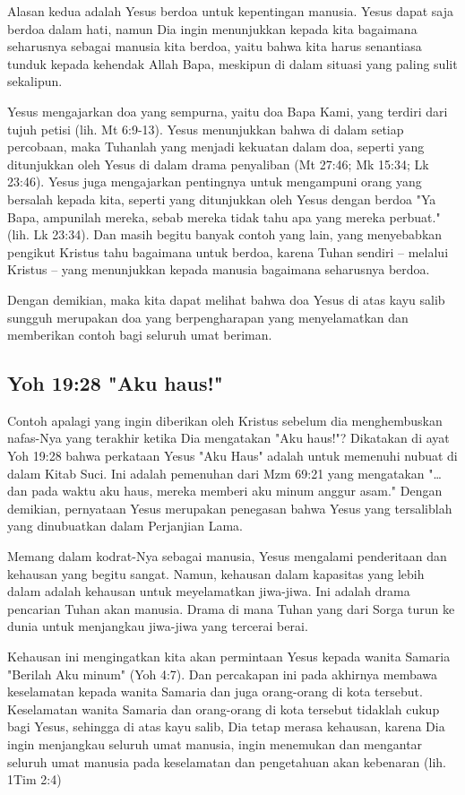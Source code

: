Alasan kedua adalah Yesus berdoa untuk kepentingan manusia. Yesus dapat saja
berdoa dalam hati, namun Dia ingin menunjukkan kepada kita bagaimana seharusnya
sebagai manusia kita berdoa, yaitu bahwa kita harus senantiasa tunduk kepada
kehendak Allah Bapa, meskipun di dalam situasi yang paling sulit sekalipun.

Yesus mengajarkan doa yang sempurna, yaitu doa Bapa Kami, yang terdiri dari
tujuh petisi (lih. Mt 6:9-13).
Yesus menunjukkan bahwa di dalam setiap percobaan, maka Tuhanlah yang menjadi
kekuatan dalam doa, seperti yang ditunjukkan oleh Yesus di dalam drama
penyaliban (Mt 27:46; Mk 15:34; Lk 23:46).
Yesus juga mengajarkan pentingnya untuk mengampuni orang yang bersalah kepada
kita, seperti yang ditunjukkan oleh Yesus dengan berdoa "Ya Bapa, ampunilah
mereka, sebab mereka tidak tahu apa yang mereka perbuat." (lih. Lk 23:34).
Dan masih begitu banyak contoh yang lain, yang menyebabkan pengikut Kristus
tahu bagaimana untuk berdoa, karena Tuhan sendiri – melalui Kristus – yang
menunjukkan kepada manusia bagaimana seharusnya berdoa.

Dengan demikian, maka kita dapat melihat bahwa doa Yesus di atas kayu salib
sungguh merupakan doa yang berpengharapan yang menyelamatkan dan memberikan
contoh bagi seluruh umat beriman.

\subsection{Yoh 19:28 "Aku haus!"}
Contoh apalagi yang ingin diberikan oleh Kristus sebelum dia menghembuskan
nafas-Nya yang terakhir ketika Dia mengatakan "Aku haus!"? Dikatakan di ayat
Yoh 19:28 bahwa perkataan Yesus "Aku Haus" adalah untuk memenuhi nubuat di
dalam Kitab Suci. Ini adalah pemenuhan dari Mzm 69:21 yang mengatakan "… dan
pada waktu aku haus, mereka memberi aku minum anggur asam." Dengan demikian,
pernyataan Yesus merupakan penegasan bahwa Yesus yang tersaliblah yang
dinubuatkan dalam Perjanjian Lama.

Memang dalam kodrat-Nya sebagai manusia, Yesus mengalami penderitaan dan
kehausan yang begitu sangat. Namun, kehausan dalam kapasitas yang lebih dalam
adalah kehausan untuk meyelamatkan jiwa-jiwa. Ini adalah drama pencarian Tuhan
akan manusia. Drama di mana Tuhan yang dari Sorga turun ke dunia untuk
menjangkau jiwa-jiwa yang tercerai berai. 

Kehausan ini mengingatkan kita akan
permintaan Yesus kepada wanita Samaria "Berilah Aku minum" (Yoh 4:7). Dan
percakapan ini pada akhirnya membawa keselamatan kepada wanita Samaria dan juga
orang-orang di kota tersebut. Keselamatan wanita Samaria dan orang-orang di
kota tersebut tidaklah cukup bagi Yesus, sehingga di atas kayu salib, Dia tetap
merasa kehausan, karena Dia ingin menjangkau seluruh umat manusia, ingin
menemukan dan mengantar seluruh umat manusia pada keselamatan dan pengetahuan
akan kebenaran (lih. 1Tim 2:4)

